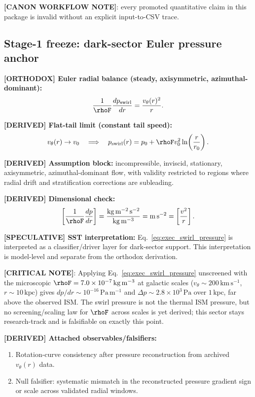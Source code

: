 \textbf{[CANON WORKFLOW NOTE]}: every promoted quantitative claim in this package is invalid without an explicit input-to-CSV trace.

\subsection{Stage-1 freeze: dark-sector Euler pressure anchor}
\textbf{[ORTHODOX] Euler radial balance (steady, axisymmetric, azimuthal-dominant):}
\begin{align}
    \frac{1}{\rhoF}\frac{dp_{\mathrm{swirl}}}{dr}
    =
    \frac{v_\theta(r)^2}{r}.
    \label{eq:exec_swirl_pressure}
\end{align}

\textbf{[DERIVED] Flat-tail limit (constant tail speed):}
\begin{align}
    v_\theta(r)\to v_0
    \quad\Longrightarrow\quad
    p_{\mathrm{swirl}}(r)
    =
    p_0 + \rhoF v_0^2\ln\!\left(\frac{r}{r_0}\right).
\end{align}

\textbf{[DERIVED] Assumption block:}
incompressible, inviscid, stationary, axisymmetric, azimuthal-dominant flow, with validity restricted to regions where radial drift and stratification corrections are subleading.

\textbf{[DERIVED] Dimensional check:}
\[
\left[\frac{1}{\rhoF}\frac{dp}{dr}\right]
=
\frac{\mathrm{kg\,m^{-2}\,s^{-2}}}{\mathrm{kg\,m^{-3}}}
=
\mathrm{m\,s^{-2}}
=
\left[\frac{v^2}{r}\right].
\]

\textbf{[SPECULATIVE] SST interpretation:}
Eq.~\eqref{eq:exec_swirl_pressure} is interpreted as a classifier/driver layer for dark-sector support. This interpretation is model-level and separate from the orthodox derivation.

\textbf{[CRITICAL NOTE]}: Applying Eq.~\eqref{eq:exec_swirl_pressure} unscreened with the microscopic $\rhoF=7.0\times10^{-7}\,\mathrm{kg\,m^{-3}}$ at galactic scales ($v_\theta\sim200\,\mathrm{km\,s^{-1}}$, $r\sim10\,\mathrm{kpc}$) gives $dp/dr\sim10^{-16}\,\mathrm{Pa\,m^{-1}}$ and $\Delta p\sim2.8\times10^{3}\,\mathrm{Pa}$ over $1\,\mathrm{kpc}$, far above the observed ISM. The swirl pressure is not the thermal ISM pressure, but no screening/scaling law for $\rhoF$ across scales is yet derived; this sector stays research-track and is falsifiable on exactly this point.

\textbf{[DERIVED] Attached observables/falsifiers:}
\begin{enumerate}
    \item Rotation-curve consistency after pressure reconstruction from archived $v_\theta(r)$ data.
    \item Null falsifier: systematic mismatch in the reconstructed pressure gradient sign or scale across validated radial windows.
\end{enumerate}


